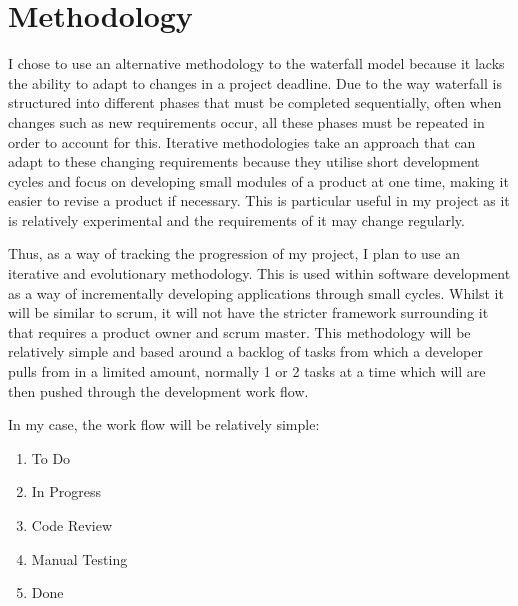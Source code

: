 \documentclass[]{report}
\begin{document}
	\chapter{Methodology}
	I chose to use an alternative methodology to the waterfall model because it lacks the ability to adapt to changes in a project deadline. Due to the way waterfall is structured into different phases that must be completed sequentially, often when changes such as new requirements occur, all these phases must be repeated in order to account for this. Iterative methodologies take an approach that can adapt to these changing requirements because they utilise short development cycles and focus on developing small modules of a product at one time, making it easier to revise a product if necessary. This is particular useful in my project as it is relatively experimental and the requirements of it may change regularly. 
		
	Thus, as a way of tracking the progression of my project, I plan to use an iterative and evolutionary methodology. This is used within software development as a way of incrementally developing applications through small cycles. Whilst it will be similar to scrum, it will not have the stricter framework surrounding it that requires a product owner and scrum master. This methodology will be relatively simple and based around a backlog of tasks from which a developer pulls from in a limited amount, normally 1 or 2 tasks at a time which will are then pushed through the development work flow.
		
	In my case, the work flow will be relatively simple:
	\begin{enumerate}
		\item To Do
		\item In Progress
		\item Code Review
		\item Manual Testing
		\item Done
	\end{enumerate}
		
\end{document}
